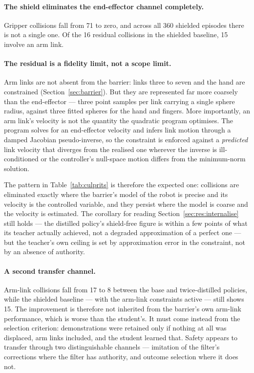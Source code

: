 \paragraph{The shield eliminates the end-effector channel completely.}
Gripper collisions fall from 71 to zero, and across all 360 shielded episodes there is not a single
one. Of the 16 residual collisions in the shielded baseline, 15 involve an arm link.

\paragraph{The residual is a fidelity limit, not a scope limit.}
Arm links are not absent from the barrier: links three to seven and the hand are constrained
(Section~\ref{sec:barrier}). But they are represented far more coarsely than the end-effector ---
three point samples per link carrying a single sphere radius, against three fitted spheres for the
hand and fingers. More importantly, an arm link's velocity is not the quantity the quadratic
program optimises. The program solves for an end-effector velocity and infers link motion through a
damped Jacobian pseudo-inverse, so the constraint is enforced against a \emph{predicted} link
velocity that diverges from the realised one wherever the inverse is ill-conditioned or the
controller's null-space motion differs from the minimum-norm solution.

The pattern in Table~\ref{tab:culprits} is therefore the expected one: collisions are eliminated
exactly where the barrier's model of the robot is precise and its velocity is the controlled
variable, and they persist where the model is coarse and the velocity is estimated. The corollary
for reading Section~\ref{sec:res:internalise} still holds --- the distilled policy's shield-free
figure is within a few points of what its teacher actually achieved, not a degraded approximation
of a perfect one --- but the teacher's own ceiling is set by approximation error in the constraint,
not by an absence of authority.

\paragraph{A second transfer channel.}
Arm-link collisions fall from 17 to 8 between the base and twice-distilled policies, while the
shielded baseline --- with the arm-link constraints active --- still shows 15. The improvement is
therefore not inherited from the barrier's own arm-link performance, which is worse than the
student's. It must come instead from the selection criterion: demonstrations were retained only if
nothing at all was displaced, arm links included, and the student learned that. Safety appears to
transfer through two distinguishable channels --- imitation of the filter's corrections where the
filter has authority, and outcome selection where it does not.

